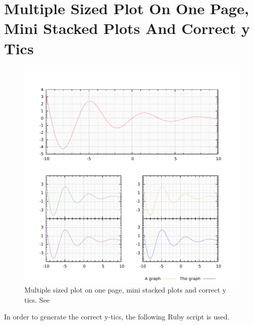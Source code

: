 \documentclass[10pt,a4paper,final]{report}
\begin{document}
\section{Multiple Sized Plot On One Page, Mini Stacked Plots And Correct y Tics} \label{sec:MultipleSizedPlots}
\begin{figure}[!hbtp]
\centering
\includegraphics[width=\textwidth]{../Code/MultipleSizedPlots/MultipleSizedPlots.pdf}
\caption{Multiple sized plot on one page, mini stacked plots and correct y tics.  See }
\end{figure}

In order to generate the correct y-tics, the following Ruby script is used.

\end{document}
